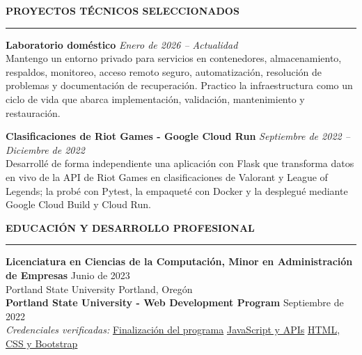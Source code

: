 \documentclass[letterpaper,10pt]{article}
\newcommand{\resumesection}[1]{%
  \vspace{4pt}
  {\large\bfseries\MakeUppercase{#1}}\par
  \vspace{2pt}
  \hrule
  \vspace{2.5pt}
}
\newcommand{\project}[3]{%
  \textbf{#1} \hfill \textit{#2}\\
  #3
}
\begin{document}
\resumesection{Proyectos técnicos seleccionados}

\project{Laboratorio doméstico}{Enero de 2026 -- Actualidad}{%
Mantengo un entorno privado para servicios en contenedores, almacenamiento, respaldos, monitoreo, acceso remoto seguro, automatización, resolución de problemas y documentación de recuperación. Practico la infraestructura como un ciclo de vida que abarca implementación, validación, mantenimiento y restauración.}

\vspace{2pt}
\project{Clasificaciones de Riot Games - Google Cloud Run}{Septiembre de 2022 -- Diciembre de 2022}{%
Desarrollé de forma independiente una aplicación con Flask que transforma datos en vivo de la API de Riot Games en clasificaciones de Valorant y League of Legends; la probé con Pytest, la empaqueté con Docker y la desplegué mediante Google Cloud Build y Cloud Run.}

\resumesection{Educación y desarrollo profesional}

\textbf{Licenciatura en Ciencias de la Computación, Minor en Administración de Empresas}
\hfill Junio de 2023\\
Portland State University \hfill Portland, Oregón\\[2pt]
\textbf{Portland State University - Web Development Program}
\hfill Septiembre de 2022\\
\textit{Credenciales verificadas:}
\href{https://www.credential.net/d5c287ef-5859-4de5-81e1-039377d2f609}{Finalización del programa} \textbar{}
\href{https://www.credential.net/97ce4aa2-99d3-4365-9dbf-cbbb423643b4}{JavaScript y APIs} \textbar{}
\href{https://www.credential.net/557f8a88-302f-4e70-bff1-672f41ed74d5}{HTML, CSS y Bootstrap}
\end{document}
